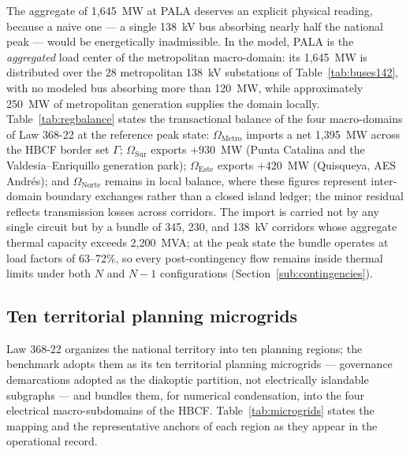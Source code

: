 The aggregate of 1,645~MW at PALA deserves an explicit physical reading, because a naive one --- a single 138~kV bus absorbing nearly half the national peak --- would be energetically inadmissible. In the model, PALA is the \emph{aggregated} load center of the metropolitan macro-domain: its 1,645~MW is distributed over the 28 metropolitan 138~kV substations of Table~\ref{tab:buses142}, with no modeled bus absorbing more than 120~MW, while approximately 250~MW of metropolitan generation supplies the domain locally. Table~\ref{tab:regbalance} states the transactional balance of the four macro-domains of Law 368-22 at the reference peak state: $\Omega_{\mathrm{Metro}}$ imports a net 1,395~MW across the HBCF border set $\Gamma$; $\Omega_{\mathrm{Sur}}$ exports $+930$~MW (Punta Catalina and the Valdesia--Enriquillo generation park); $\Omega_{\mathrm{Este}}$ exports $+420$~MW (Quisqueya, AES Andr\'es); and $\Omega_{\mathrm{Norte}}$ remains in local balance, where these figures represent inter-domain boundary exchanges rather than a closed island ledger; the minor residual reflects transmission losses across corridors. The import is carried not by any single circuit but by a bundle of 345, 230, and 138~kV corridors whose aggregate thermal capacity exceeds 2,200~MVA; at the peak state the bundle operates at load factors of 63--72\%, so every post-contingency flow remains inside thermal limits under both $N$ and $N-1$ configurations (Section~\ref{sub:contingencies}).

\subsection{Ten territorial planning microgrids}
\label{sub:microgrids}

Law 368-22 organizes the national territory into ten planning regions; the benchmark adopts them as its ten territorial planning microgrids --- governance demarcations adopted as the diakoptic partition, not electrically islandable subgraphs --- and bundles them, for numerical condensation, into the four electrical macro-subdomains of the HBCF. Table~\ref{tab:microgrids} states the mapping and the representative anchors of each region as they appear in the operational record.

